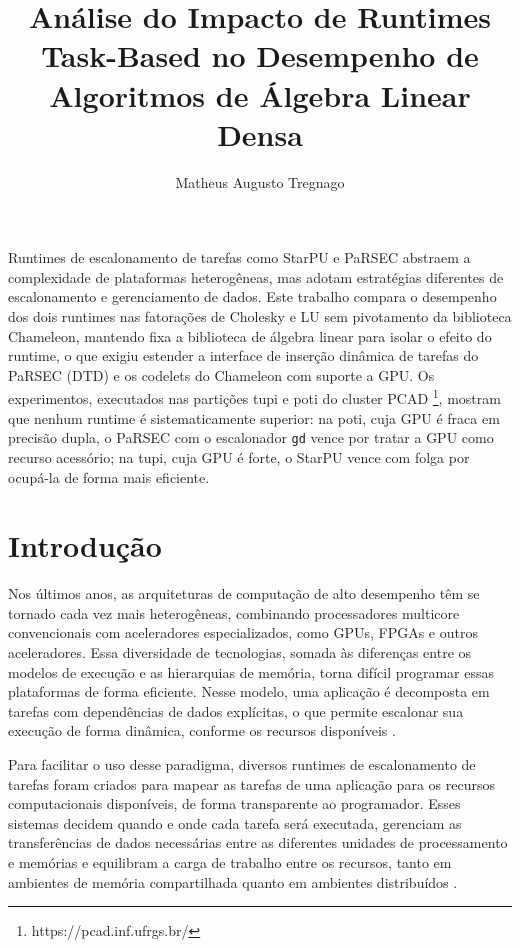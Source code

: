 \documentclass[12pt]{article}
\title{Análise do Impacto de Runtimes Task-Based no Desempenho de Algoritmos de Álgebra Linear Densa}
\author{Matheus Augusto Tregnago}
\begin{document}
\maketitle

\begin{resumo}
	Runtimes de escalonamento de tarefas como StarPU e PaRSEC abstraem a complexidade de plataformas heterogêneas, mas adotam estratégias diferentes de escalonamento e gerenciamento de dados. Este trabalho compara o desempenho dos dois runtimes nas fatorações de Cholesky e LU sem pivotamento da biblioteca Chameleon, mantendo fixa a biblioteca de álgebra linear para isolar o efeito do runtime, o que exigiu estender a interface de inserção dinâmica de tarefas do PaRSEC (DTD) e os codelets do Chameleon com suporte a GPU. Os experimentos, executados nas partições tupi e poti do cluster PCAD \footnote{https://pcad.inf.ufrgs.br/}, mostram que nenhum runtime é sistematicamente superior: na poti, cuja GPU é fraca em precisão dupla, o PaRSEC com o escalonador \texttt{gd} vence por tratar a GPU como recurso acessório; na tupi, cuja GPU é forte, o StarPU vence com folga por ocupá-la de forma mais eficiente.
\end{resumo}

\section{Introdução}

Nos últimos anos, as arquiteturas de computação de alto desempenho têm se tornado cada vez mais heterogêneas, combinando processadores multicore convencionais com aceleradores especializados, como GPUs, FPGAs e outros aceleradores. Essa diversidade de tecnologias, somada às diferenças entre os modelos de execução e as hierarquias de memória, torna difícil programar essas plataformas de forma eficiente. Nesse modelo, uma aplicação é decomposta em tarefas com dependências de dados explícitas, o que permite escalonar sua execução de forma dinâmica, conforme os recursos disponíveis \cite{10025520}.

Para facilitar o uso desse paradigma, diversos runtimes de escalonamento de tarefas foram criados para mapear as tarefas de uma aplicação para os recursos computacionais disponíveis, de forma transparente ao programador. Esses sistemas decidem quando e onde cada tarefa será executada, gerenciam as transferências de dados necessárias entre as diferentes unidades de processamento e memórias e equilibram a carga de trabalho entre os recursos, tanto em ambientes de memória compartilhada quanto em ambientes distribuídos \cite{aguerrebere2018hdr}.
\end{document}
